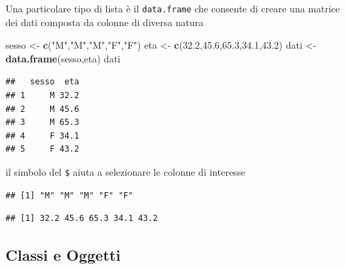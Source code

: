\documentclass[
  11pt,
]{book}
\newenvironment{Shaded}{\begin{snugshade}}{\end{snugshade}}
\newcommand{\FloatTok}[1]{\textcolor[rgb]{0.00,0.00,0.81}{#1}}
\newcommand{\FunctionTok}[1]{\textcolor[rgb]{0.13,0.29,0.53}{\textbf{#1}}}
\newcommand{\NormalTok}[1]{#1}
\newcommand{\OtherTok}[1]{\textcolor[rgb]{0.56,0.35,0.01}{#1}}
\newcommand{\SpecialCharTok}[1]{\textcolor[rgb]{0.81,0.36,0.00}{\textbf{#1}}}
\newcommand{\StringTok}[1]{\textcolor[rgb]{0.31,0.60,0.02}{#1}}
\theoremstyle{mytheoremstyle}
\theoremstyle{mydefstyle}
\begin{document}
Una particolare tipo di lista è il \texttt{data.frame} che consente di creare una matrice dei
dati composta da colonne di diversa natura

\begin{Shaded}
\begin{Highlighting}[]
\NormalTok{sesso }\OtherTok{\textless{}{-}} \FunctionTok{c}\NormalTok{(}\StringTok{"M"}\NormalTok{,}\StringTok{"M"}\NormalTok{,}\StringTok{"M"}\NormalTok{,}\StringTok{"F"}\NormalTok{,}\StringTok{"F"}\NormalTok{)}
\NormalTok{eta   }\OtherTok{\textless{}{-}} \FunctionTok{c}\NormalTok{(}\FloatTok{32.2}\NormalTok{,}\FloatTok{45.6}\NormalTok{,}\FloatTok{65.3}\NormalTok{,}\FloatTok{34.1}\NormalTok{,}\FloatTok{43.2}\NormalTok{)}
\NormalTok{dati }\OtherTok{\textless{}{-}} \FunctionTok{data.frame}\NormalTok{(sesso,eta)}
\NormalTok{dati}
\end{Highlighting}
\end{Shaded}

\begin{verbatim}
##   sesso  eta
## 1     M 32.2
## 2     M 45.6
## 3     M 65.3
## 4     F 34.1
## 5     F 43.2
\end{verbatim}

il simbolo del \texttt{\$} aiuta a selezionare le colonne di interesse

\begin{Shaded}
\end{Shaded}

\begin{verbatim}
## [1] "M" "M" "M" "F" "F"
\end{verbatim}

\begin{Shaded}
\end{Shaded}

\begin{verbatim}
## [1] 32.2 45.6 65.3 34.1 43.2
\end{verbatim}

\subsection{Classi e Oggetti}\label{classi-e-oggetti}
\end{document}

